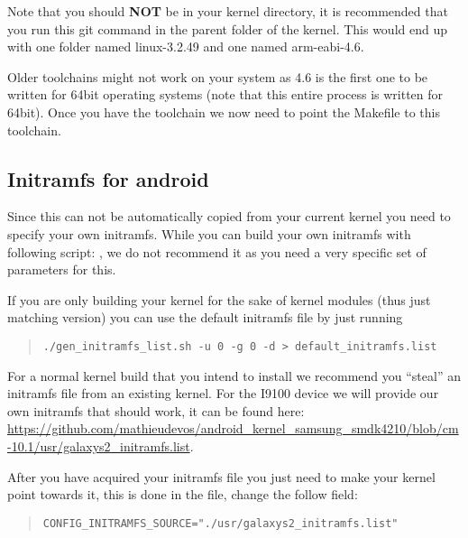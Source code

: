 Note that you should \textbf{NOT} be in your kernel directory, it is recommended that you run this git command in the parent folder of the kernel. This would end up with one folder named linux-3.2.49 and one named arm-eabi-4.6.

\npar

Older toolchains might not work on your system as 4.6 is the first one to be written for 64bit operating systems (note that this entire process is written for 64bit). Once you have the toolchain we now need to point the Makefile to this toolchain.

\subsection*{Initramfs for android}

Since this can not be automatically copied from your current kernel you need to specify your own initramfs. While you can build your own initramfs with following script: , we do not recommend it as you need a very specific set of parameters for this. 

\npar

If you are only building your kernel for the sake of kernel modules (thus just matching version) you can use the default initramfs file by just running

\begin{quote} \begin{verbatim}./gen_initramfs_list.sh -u 0 -g 0 -d > default_initramfs.list \end{verbatim} \end{quote}



\npar

For a normal kernel build that you intend to install we recommend you ``steal'' an initramfs file from an existing kernel. For the I9100 device we will provide our own initramfs that should work, it can be found here: \url{https://github.com/mathieudevos/android_kernel_samsung_smdk4210/blob/cm-10.1/usr/galaxys2_initramfs.list}. 

\npar

After you have acquired your initramfs file you just need to make your kernel point towards it, this is done in the  file, change the follow field:

\begin{quote} \begin{verbatim}CONFIG_INITRAMFS_SOURCE="./usr/galaxys2_initramfs.list" \end{verbatim} \end{quote}

